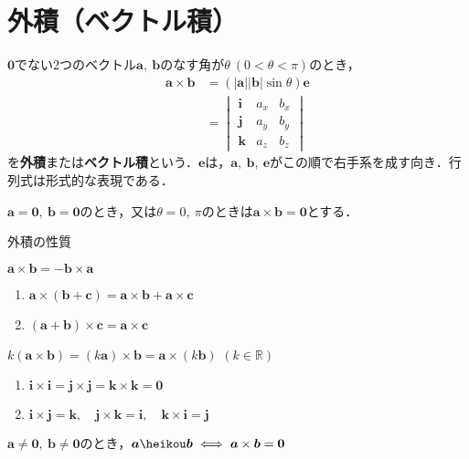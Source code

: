 \section{外積（ベクトル積）}

$\bm{0}$でない2つのベクトル$\bm{a},\ \bm{b}$のなす角が$\theta\ (0 < \theta < \pi)$のとき，
\begin{align}
	\bm{a} \times \bm{b} &= (|\bm{a}||\bm{b}|\sin\theta)\bm{e}\\
	&= 
	\begin{vmatrix}
		\bm{i} & a_x & b_x\\
		\bm{j} & a_y & b_y\\
		\bm{k} & a_z & b_z
	\end{vmatrix}
\end{align}
を\textbf{外積}または\textbf{ベクトル積}という．$\bm{e}$は，$\bm{a},\ \bm{b},\ \bm{e}$がこの順で右手系を成す向き．行列式は形式的な表現である．

$\bm{a} = \bm{0},\ \bm{b} = \bm{0}$のとき，又は$\theta = 0,\ \pi$のときは$\bm{a} \times \bm{b} = \bm{0}$とする．

\begin{kousiki}{外積の性質}
	\begin{enumerate}[label=\textbf{[\arabic*]}, labelsep=10pt, leftmargin=23pt]
		\item $\bm{a} \times \bm{b} = -\bm{b} \times \bm{a}$
		\item 
			\begin{enumerate}[label=(\roman*), labelsep=10pt, leftmargin=23pt]
				\item $\bm{a} \times (\bm{b} + \bm{c}) = \bm{a} \times \bm{b} + \bm{a} \times \bm{c}$
				\item $(\bm{a} + \bm{b}) \times \bm{c} = \bm{a} \times \bm{c}$
			\end{enumerate}
		\item $k(\bm{a} \times \bm{b}) = (k\bm{a}) \times \bm{b} = \bm{a} \times (k\bm{b})$ \qquad $(k \in \mathbb{R})$
		\item
			\begin{enumerate}[label=(\roman*), labelsep=10pt, leftmargin=23pt]
				\item $\bm{i} \times \bm{i} = \bm{j} \times \bm{j} = \bm{k} \times \bm{k} = \bm{0}$
				\item $\bm{i} \times \bm{j} = \bm{k},\quad \bm{j} \times \bm{k} = \bm{i},\quad \bm{k} \times \bm{i} = \bm{j}$
			\end{enumerate}
		\item $\bm{a} \ne \bm{0},\ \bm{b} \ne \bm{0}$のとき，$\bm{a} \heikou \bm{b} \iff \bm{a} \times \bm{b} = \bm{0}$
	\end{enumerate}
	
\end{kousiki}

